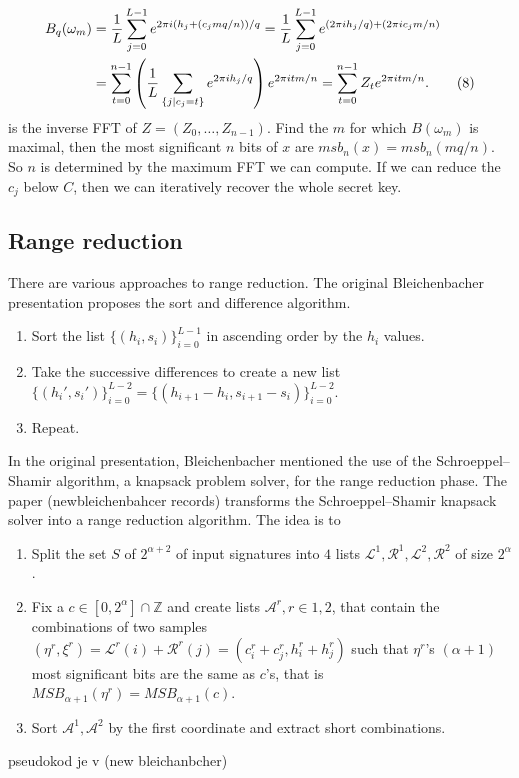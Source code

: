 \begin{align}
    B_q(\omega_m) 
    &= \frac{1}{L} \sum_{j=0}^{L-1} e^{2\pi i (h_j + (c_j m q / n))/q} 
    = \frac{1}{L} \sum_{j=0}^{L-1} e^{(2\pi i h_j / q) + (2\pi i c_j m / n)} \notag \\
    &= \sum_{t=0}^{n-1} \left( \frac{1}{L} \sum_{\substack{\{j \mid c_j = t\}}} e^{2\pi i h_j / q} \right) e^{2\pi i t m / n} 
    = \sum_{t=0}^{n-1} Z_t e^{2\pi i t m / n}. \tag{8}
\end{align}
is the inverse FFT of $Z = (Z_0, \ldots, Z_{n-1})$. Find the $m$ for which $B(\omega_m)$ is maximal, then the most significant $n$ bits of $x$ are $msb_n(x) = msb_n(mq/n)$. So $n$ is determined by the maximum FFT we can compute. If we can reduce the $c_j$ below $C$, then we can iteratively recover the whole secret key.

\subsection{Range reduction}
There are various approaches to range reduction. The original Bleichenbacher presentation proposes the sort and difference algorithm.

\begin{enumerate}
    \item Sort the list $\{(h_i, s_i)\}_{i=0}^{L-1}$ in ascending order by the $h_i$ values.
    \item Take the successive differences to create a new list $\{(h_i', s_i')\}_{i=0}^{L-2} = \{(h_{i+1} - h_i, s_{i+1} - s_i)\}_{i=0}^{L-2}$.
    \item Repeat.
\end{enumerate}

In the original presentation, Bleichenbacher mentioned the use of the Schroeppel–Shamir algorithm, a knapsack problem solver, for the range reduction phase. The paper (newbleichenbahcer records) transforms the Schroeppel–Shamir knapsack solver into a range reduction algorithm. The idea is to 

\begin{enumerate}
    \item Split the set $S$ of $2^{\alpha +2}$ of input signatures into $4$ lists $\mathcal{L}^1, \mathcal{R}^1, \mathcal{L}^2, \mathcal{R}^2$ of size $2^\alpha$.
    \item Fix a $c \in [0,2^\alpha] \cap  \mathbb{Z}$ and create lists $\mathcal{A}^r, r \in 1,2$, that contain the combinations of two samples $(\eta^r, \xi^r) = \mathcal{L}^r(i) + \mathcal{R}^r(j) = (c_i^r + c_j^r, h_i^r + h_j^r)$ such that $\eta^r$'s $(\alpha + 1)$ most significant bits are the same as $c$'s, that is $MSB_{\alpha + 1}(\eta^r) = MSB_{\alpha + 1}(c)$. 
    \item Sort $\mathcal{A}^1, \mathcal{A}^2$ by the first coordinate and extract short combinations.
\end{enumerate}
pseudokod je v (new bleichanbcher)
\newpage
